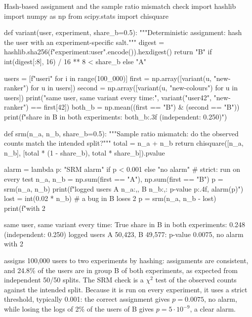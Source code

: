 \begin{pylisting}[label={lst:srm}]{Hash-based assignment and the sample ratio mismatch check}
import hashlib
import numpy as np
from scipy.stats import chisquare

def variant(user, experiment, share_b=0.5):
    """Deterministic assignment: hash the user with an experiment-specific salt."""
    digest = hashlib.sha256(f"{experiment}:{user}".encode()).hexdigest()
    return "B" if int(digest[:8], 16) / 16 ** 8 < share_b else "A"

users = [f"user{i}" for i in range(100_000)]
first = np.array([variant(u, "new-ranker") for u in users])
second = np.array([variant(u, "new-colours") for u in users])
print("same user, same variant every time:", variant("user42", "new-ranker") == first[42])
both_b = np.mean((first == "B") & (second == "B"))
print(f"share in B in both experiments: {both_b:.3f} (independent: 0.250)")

def srm(n_a, n_b, share_b=0.5):
    """Sample ratio mismatch: do the observed counts match the intended split?"""
    total = n_a + n_b
    return chisquare([n_a, n_b], [total * (1 - share_b), total * share_b]).pvalue

alarm = lambda p: "SRM alarm" if p < 0.001 else "no alarm"   # strict: run on every test
n_a, n_b = np.sum(first == "A"), np.sum(first == "B")
p = srm(n_a, n_b)
print(f"logged users A {n_a:,}, B {n_b:,}: p-value {p:.4f}, {alarm(p)}")
lost = int(0.02 * n_b)                    # a bug in B loses 2%
p = srm(n_a, n_b - lost)
print(f"with 2%
\end{pylisting}
\begin{pyoutput}
same user, same variant every time: True
share in B in both experiments: 0.248 (independent: 0.250)
logged users A 50,423, B 49,577: p-value 0.0075, no alarm
with 2%
\end{pyoutput}

 assigns 100,000 users to two experiments by hashing: assignments are consistent, and 24.8\% of the users are in
group B of both experiments, as expected from independent 50/50 splits. The SRM check is a $\chi^2$ test of the observed counts
against the intended split. Because it is run on every experiment, it uses a strict threshold, typically 0.001: the correct
assignment gives $p=0.0075$, no alarm, while losing the logs of 2\% of the users of B gives $p=5\cdot10^{-9}$, a clear alarm.

